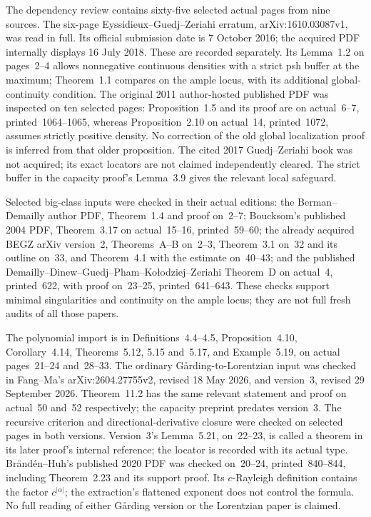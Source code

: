 The dependency review contains sixty-five selected actual pages
from nine sources. The six-page Eyssidieux--Guedj--Zeriahi
erratum, arXiv:1610.03087v1, was read in full. Its official
submission date is 7 October 2016; the acquired PDF internally
displays 16 July 2018. These are recorded separately.
Its Lemma~1.2 on pages~2--4 allows nonnegative continuous
densities with a strict psh buffer at the maximum; Theorem~1.1
compares on the ample locus, with its additional global-continuity
condition. The original 2011 author-hosted published PDF was
inspected on ten selected pages: Proposition~1.5 and its proof
are on actual~6--7, printed~1064--1065, whereas Proposition~2.10
on actual~14, printed~1072, assumes strictly positive density.
No correction of the old global localization proof is inferred
from that older proposition. The cited 2017 Guedj--Zeriahi
book was not acquired; its exact locators are not claimed
independently cleared. The strict buffer in the capacity proof's
Lemma~3.9 gives the relevant local safeguard.

Selected big-class inputs were checked in their actual editions:
the Berman--Demailly author PDF, Theorem~1.4 and proof on~2--7;
Boucksom's published 2004 PDF, Theorem~3.17 on actual~15--16,
printed~59--60; the already acquired BEGZ arXiv version~2,
Theorems~A--B on~2--3, Theorem~3.1 on~32 and its outline on~33,
and Theorem~4.1 with the estimate on~40--43; and the published
Demailly--Dinew--Guedj--Pham--Ko\l odziej--Zeriahi Theorem~D
on actual~4, printed~622, with proof on~23--25, printed~641--643.
These checks support minimal singularities and continuity on
the ample locus; they are not full fresh audits of all those papers.

The polynomial import is in Definitions~4.4--4.5,
Proposition~4.10, Corollary~4.14, Theorems~5.12, 5.15 and~5.17,
and Example~5.19, on actual pages~21--24 and~28--33.
The ordinary G\aa rding-to-Lorentzian input was checked in
Fang--Ma's arXiv:2604.27755v2, revised 18 May 2026, and
version~3, revised 29 September 2026. Theorem~11.2 has the
same relevant statement and proof on actual~50 and~52 respectively;
the capacity preprint predates version~3.
The recursive criterion and directional-derivative closure were
checked on selected pages in both versions. Version~3's
Lemma~5.21, on~22--23, is called a theorem in its later proof's
internal reference; the locator is recorded with its actual type.
Br\"and\'en--Huh's published 2020 PDF was checked on~20--24,
printed~840--844, including Theorem~2.23 and its support proof.
Its $c$-Rayleigh definition contains the factor $c^{|\alpha|}$;
the extraction's flattened exponent does not control the formula.
No full reading of either G\aa rding version or the Lorentzian
paper is claimed.

